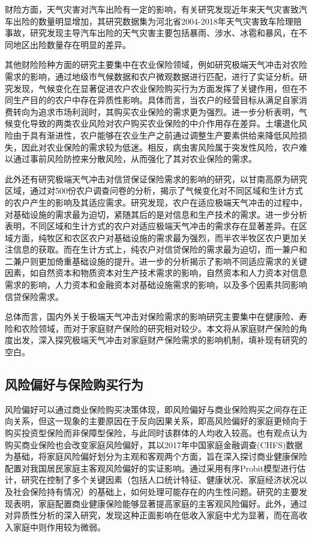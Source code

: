 财险方面，天气灾害对汽车出险有一定的影响，有关研究发现近年来天气灾害致汽车出险的数量明显增加\citep{张翠华2020天气灾害致车险理赔的风险分析}，其研究数据集为河北省2004-2018年天气灾害致车险理赔事故，研究发现主导汽车出险的天气灾害主要包括暴雨、涉水、冰雹和暴风，在不同地区出险数量存在明显的差异。

其他财险险种方面的研究主要集中在农业保险领域，例如研究极端天气冲击对农险需求的影响\citep{胡新艳2021气候变化}，通过地级市气候数据和农户微观数据进行匹配，进行了实证分析。研究发现，气候变化在显著促进农户农业保险购买行为方面发挥了关键作用，但在不同生产目的的农户中存在异质性影响。具体而言，当农户的经营目标从满足自家消费转向为追求市场利润时，其购买农业保险的需求更为强烈。进一步分析表明，气候变化导致的两类农业风险对农户购买农业保险的中介作用存在差异。土壤退化风险由于具有渐进性，农户能够在农业生产之前通过调整生产要素供给来降低风险损失，因此对农业保险的需求较为低迷。相反，病虫害风险属于突发性风险，农户难以通过事前风险防控来分散风险，从而强化了其对农业保险的需求。

此外还有研究极端天气冲击对信贷保证保险需求的影响的研究\citep{张钦2017高寒生态脆弱区农户对气候变化的适应需求}，以甘南高原为研究区域，通过对500份农户调查问卷的分析，揭示了气候变化对不同区域和生计方式的农户产生的影响及其适应需求。研究发现，农户在适应极端天气冲击的过程中，对基础设施的需求最为迫切，紧随其后的是对信息和生产技术的需求。进一步分析表明，不同区域和生计方式的农户对适应极端天气冲击的需求存在显著差异。在区域方面，纯牧区和农区农户对基础设施的需求最为强烈，而半农半牧区农户更加关注信息的获取。而在生计方式上，纯农户对信贷保险的需求最为迫切，而一兼户和二兼户则更加倚重基础设施的提升。进一步的分析揭示了影响不同适应需求的关键因素，如自然资本和物质资本对生产技术需求的影响，自然资本和人力资本对信息需求的影响，人力资本和金融资本对基础设施需求的影响，以及多个因素共同影响信贷保险需求。

总体而言，国内外关于极端天气冲击对保险需求的影响研究主要集中在健康险、寿险和农险领域，而对于家庭财产保险的研究相对较少。本文将从家庭财产保险的角度出发，深入探究极端天气冲击对家庭财产保险需求的影响机制，填补现有研究的空白。

\subsection{风险偏好与保险购买行为}
风险偏好可以通过商业保险购买决策体现，即风险偏好与商业保险购买之间存在正向关系\citep{宋章良2021我国中老年家庭风险偏好对商业保险购买行为的影响研究}，但这一现象的主要原因在于反向因果关系，即高风险偏好的家庭更倾向于购买投资型保险而非保障型保险，与此同时该群体的人均收入较高。也有观点认为购买商业保险也会改变家庭风险偏好\citep{孙武军2023商业健康保险的配置能够改变家庭的风险偏好吗}，其以2017年中国家庭金融调查(CHFS)数据为基础，将家庭风险偏好划分为主观和客观两个方面，旨在深入探讨商业健康保险配置对我国居民家庭主客观风险偏好的实证影响。通过采用有序Probit模型进行估计，研究在控制了多个关键因素（包括人口统计特征、健康状况、家庭经济状况以及社会保险持有情况）的基础上，如何处理可能存在的内生性问题。研究的主要发现表明，家庭配置商业健康保险能够显著提高家庭的主客观风险偏好。此外，通过对异质性分析的深入研究，发现这种正面影响在低收入家庭中尤为显著，而在高收入家庭中则作用较为微弱。


